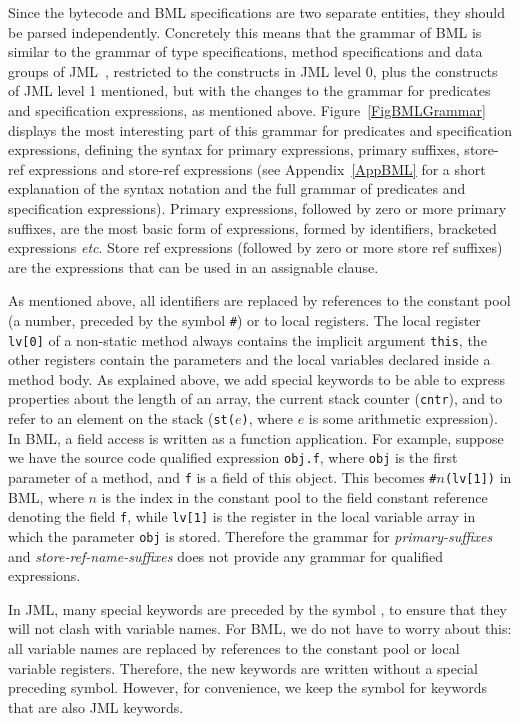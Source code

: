 \documentclass[a4paper]{llncs}
\begin{document}
Since the bytecode and BML specifications are two separate entities,
they should be parsed independently. Concretely this means that the
grammar of BML is similar to the grammar of type specifications,
method specifications and data groups of JML~\cite[\S A.5, A.6,
A.7]{JMLReferenceManual05}, restricted to the constructs in JML level
0, plus the constructs of JML level 1 mentioned, but with the changes
to the grammar for predicates and specification expressions, as
mentioned above. Figure~\ref{FigBMLGrammar} displays the most
interesting part of this grammar for predicates and specification
expressions, defining the syntax for primary expressions, primary
suffixes, store-ref expressions and store-ref expressions (see
Appendix~\ref{AppBML} for a short explanation of the syntax notation
and the full grammar of predicates and specification
expressions). Primary expressions, followed by zero or more primary
suffixes, are the most basic form of expressions, formed by
identifiers, bracketed expressions
\emph{etc}. Store ref expressions (followed by zero or more store ref 
suffixes) are the expressions that can be used in an assignable
clause.

As mentioned above, all identifiers are replaced by references to the
constant pool (a number, preceded by the symbol
\texttt{\#}) or to local registers. The local register \texttt{lv[0]}
of a non-static method always contains the implicit argument
\texttt{this}, the other registers contain the parameters and the
local variables declared inside a method body. As explained above, we
add special keywords to be able to express properties about the length
of an array, the current stack counter (\texttt{cntr}), and to refer
to an element on the stack (\texttt{st(\(e\))}, where \(e\) is some
arithmetic expression). In BML, a field access is written as a function
application. For example, suppose we have the source code qualified expression
\texttt{obj.f}, where \texttt{obj} is the first parameter of a
method, and \texttt{f} is a field of this object. This becomes
\texttt{\#\(n\)(lv[1])} in BML, where \(n\) is the index in the
constant pool to the field constant reference denoting the field
\texttt{f}, while \texttt{lv[1]} is the register in the local variable
array in which the parameter \texttt{obj} is stored.  Therefore the
grammar for \emph{primary-suffixes} and \emph{store-ref-name-suffixes}
does not provide any grammar for qualified expressions.


In JML, many special keywords are preceded by the symbol
\texttt{\bsl}, to ensure that they will not clash with variable
names. For BML, we do not have to worry about this: all
variable names are replaced by references to the constant pool or
local variable registers. Therefore, the new keywords are written
without a special preceding symbol. However, for convenience, we keep
the symbol for keywords that are also JML keywords.
\end{document}
